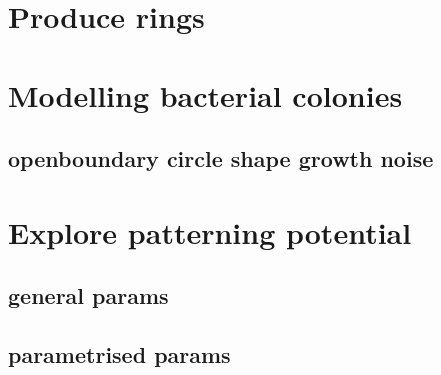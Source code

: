 \section{Produce rings}
\section{Modelling bacterial colonies}
\subsection{openboundary circle shape growth noise}
\section{Explore patterning potential}
\subsection{general params}
\subsection{parametrised params}
